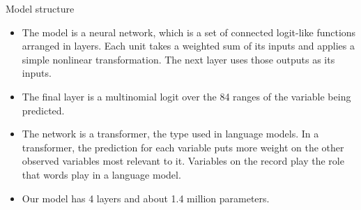 \documentclass[11pt,aspectratio=169]{beamer}
\begin{document}
\begin{frame}{Model structure}
  \begin{itemize}
    \item The model is a neural network, which is a set of connected logit-like functions arranged in
          layers. Each unit takes a weighted sum of its inputs and applies a simple nonlinear
          transformation. The next layer uses those outputs as its inputs.
    \vspace{0.5em}
    \item The final layer is a multinomial logit over the 84 ranges of the variable being predicted.
    \vspace{0.5em}
    \item The network is a transformer, the type used in language models. In a transformer, the
          prediction for each variable puts more weight on the other observed variables most relevant to it.
          Variables on the record play the role that words play in a language model.
    \vspace{0.5em}
    \item Our model has 4 layers and about 1.4 million parameters.
  \end{itemize}
\end{frame}
\end{document}
